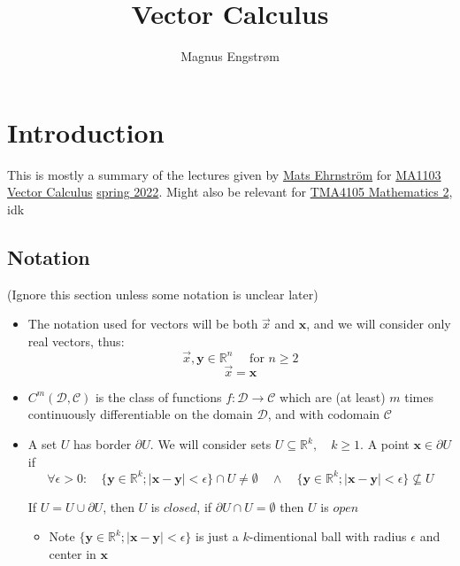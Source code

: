 \documentclass{article}
\title{Vector Calculus}
\author{Magnus Engstrøm}
\theoremstyle{plain}
\begin{document}
\maketitle

\tableofcontents


\section{Introduction}

This is mostly a summary of the lectures given by 
\href{https://www.ntnu.no/ansatte/mats.ehrnstrom}{Mats Ehrnström}
for \href{https://www.ntnu.edu/studies/courses/MA1103#tab=omEmnet}{MA1103 Vector Calculus}
\href{https://wiki.math.ntnu.no/ma1103/2022v/start}{spring 2022}. 
Might also be relevant for \href{https://www.ntnu.edu/studies/courses/TMA4105#tab=omEmnet}{TMA4105 Mathematics 2}, idk

\subsection{Notation}

(Ignore this section unless some notation is unclear later)

\begin{itemize}
    \item The notation used for vectors will be both $\vec{x}$ and $\mathbf x$, and we will consider
    only real vectors, thus:
    $$\vec{x}, \mathbf y \in \mathbb R^n \quad \textrm{ for } n \geq 2$$
    $$\vec{x} = \mathbf x$$

    \item $C^m(\mathcal D, \mathcal C)$ is the class of functions $f: \mathcal D \rightarrow \mathcal C$ which are (at least) $m$ times continuously differentiable
    on the domain $\mathcal D$, and with codomain $\mathcal C$

    \item A set $U$ has border $\partial U$. We will consider sets $U \subseteq \mathbb R^k, \quad k \geq 1$.
    A point $\mathbf x \in \partial U$ if 
    $$\forall \epsilon > 0: \quad \{ \mathbf y \in \mathbb R^k; |\mathbf x - \mathbf y| < \epsilon\} \cap U \neq \emptyset \quad \land \quad \{ \mathbf y \in \mathbb R^k; |\mathbf x - \mathbf y| < \epsilon\} \not \subseteq U$$

    If $U = U \cup \partial U$, then $U$ is $closed$, if $\partial U \cap U = \emptyset$ then $U$ is $open$
    \begin{itemize}
        \item Note $\{ \mathbf y \in \mathbb R^k; |\mathbf x - \mathbf y| < \epsilon\}$ is just a $k$-dimentional ball with radius $\epsilon$ and center in $\mathbf x$
    \end{itemize}
\end{itemize}
\end{document}
